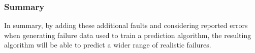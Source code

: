 \subsubsection{Summary} \label{sec:extSum}
In summary, by adding these additional faults and considering reported errors
when generating failure data used to train a prediction algorithm, the
resulting algorithm will be able to predict a wider range of realistic
failures.  
